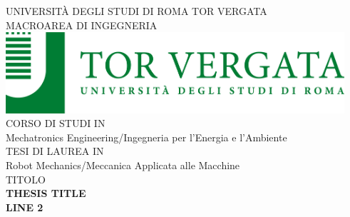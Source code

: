 \begin{titlepage}

%        
%


\begin{center}
    \vspace{6mm}
    \large{UNIVERSITÀ DEGLI STUDI DI ROMA TOR VERGATA}
    \vspace{3mm}
    \\ \normalsize{MACROAREA DI INGEGNERIA}
    \vspace{12mm}
    \\ \includegraphics[height=3cm]{Figures/logo_tv.png}
    \vspace{12mm}
    \\ \normalsize{CORSO DI STUDI IN}
    \vspace{3mm}
    \\ \normalsize{Mechatronics Engineering/Ingegneria per l'Energia e l'Ambiente}
    \vspace{6mm}
    \\ \normalsize{TESI DI LAUREA IN}
    \vspace{3mm}
    \\ \normalsize{Robot Mechanics/Meccanica Applicata alle Macchine}
    \vspace{12mm}
    \\ \normalsize{TITOLO}
    \vspace{6mm}
    \\ \LARGE{\textbf{THESIS TITLE}}
    \\ \LARGE{\textbf{LINE 2}}
\end{center}


\end{titlepage}
